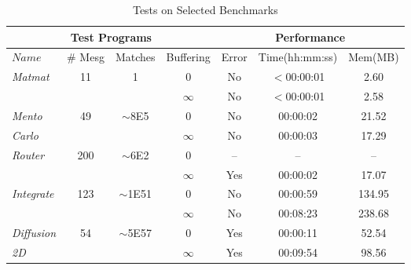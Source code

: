 \begin{table*}[t]
\begin{center}
\scriptsize
\caption{Tests on Selected Benchmarks}\label{table:benchmarks}
\begin{tabular}{|l|c|c|c|c|c|c|}
		\hline
         \multicolumn{4}{|c|}{Test Programs} & \multicolumn{3}{|c|}{Performance} \\ \hline
          $Name$&\# Mesg&Matches&Buffering&Error&Time(hh:mm:ss)&Mem(MB) \\ \hline
           \textit{Matmat} & 11 & 1 & 0 & No & $<$00:00:01 & 2.60\\
          	      & & & $\infty$ & No & $<$00:00:01 & 2.58\\ \hline
	 \textit{Mento} & 49 & $\sim$8E5 & 0 & No & 00:00:02 & 21.52\\
          \textit{Carlo}  & & & $\infty$ & No & 00:00:03 & 17.29 \\ \hline
	 \textit{Router}   & 200 & $\sim$6E2 & 0 & -- & -- & --\\
          	      & & & $\infty$ & Yes & 00:00:02 & 17.07 \\ \hline
	 \textit{Integrate}  & 123 & $\sim$1E51 & 0 & No & 00:00:59 & 134.95 \\
          	      & & &  $\infty$ & No & 00:08:23 & 238.68\\ \hline
	  \textit{Diffusion}  & 54 & $\sim$5E57 & 0 & Yes & 00:00:11 & 52.54 \\
           \textit{2D} &  & & $\infty$ & Yes & 00:09:54 & 98.56\\ \hline          
          		\end{tabular}
\end{center}
\end{table*}


